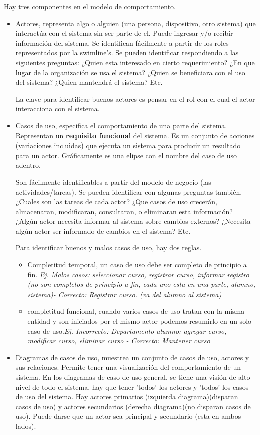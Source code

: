 \documentclass[titlepage,a4paper]{article}
\begin{document}
Hay tres componentes en el modelo de comportamiento.
\begin{itemize}
    \item Actores, representa algo o alguien (una persona, dispositivo, otro sistema) que interactúa con el sistema sin ser parte de el. Puede ingresar y/o recibir información del sistema. Se identifican fácilmente a partir de los roles representados por la swimline's. Se pueden identificar respondiendo a las siguientes preguntas: ¿Quien esta interesado en cierto requerimiento? ¿En que lugar de la organización se usa el sistema? ¿Quien se beneficiara con el uso del sistema? ¿Quien mantendrá el sistema? Etc.
    
    La clave para identificar buenos actores es pensar en el rol con el cual el actor interacciona con el sistema.

    \item Casos de uso, especifica el comportamiento de una parte del sistema. Representan un \textbf{requisito funcional} del sistema. Es un conjunto de acciones (variaciones incluidas) que ejecuta un sistema para producir un resultado para un actor. Gráficamente es una elipse con el nombre del caso de uso adentro.
    
    Son fácilmente identificables a partir del modelo de negocio (las actividades/tareas). Se pueden identificar con algunas preguntas también. ¿Cuales son las tareas de cada actor? ¿Que casos de uso crecerán, almacenaran, modificaran, consultaran, o eliminaran esta información? ¿Algún actor necesita informar al sistema sobre cambios externos? ¿Necesita algún actor ser informado de cambios en el sistema? Etc.
    
    Para identificar buenos y malos casos de uso, hay dos reglas.
    \begin{itemize}
        \item Completitud temporal, un caso de uso debe ser completo de principio a fin. \textit{Ej. Malos casos: seleccionar curso, registrar curso, informar registro (no son completos de principio a fin, cada uno esta en una parte, alumno, sistema)- Correcto: Registrar curso. (va del alumno al sistema)}
        \item completitud funcional, cuando varios casos de uso tratan con la misma entidad y son iniciados por el mismo actor podemos resumirlo en un solo caso de uso.\textit{Ej. Incorrecto: Departamento alumno: agregar curso, modificar curso, eliminar curso - Correcto: Mantener curso}
    \end{itemize}
    
    \item Diagramas de casos de uso, muestrea un conjunto de casos de uso, actores y sus relaciones. Permite tener una visualización del comportamiento de un sistema. En los diagramas de caso de uso general, se tiene una visión de alto nivel de todo el sistema, hay que tener 'todos' los actores y 'todos' los casos de uso del sistema. Hay actores primarios (izquierda diagrama)(disparan casos de uso) y actores secundarios (derecha diagrama)(no disparan casos de uso). Puede darse que un actor sea principal y secundario (esta en ambos lados).
\end{itemize}
\end{document}
